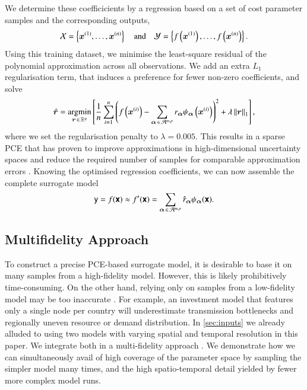 We determine these coefficicients by a regression based on
a set of cost parameter samples
and the corresponding outputs,
\begin{equation}
    \mathcal{X} = \left\{ \bm x^{(1)},\dots,\bm x^{(n)} \right\} \quad\text{and}\quad 
    \mathcal{Y} = \left\{ f\left(\bm x^{(1)}\right),\dots,f\left(\bm x^{(n)}\right) \right\}.
\end{equation}
Using this training dataset, we minimise the least-square residual of the polynomial approximation across all observations.
We add an extra $L_1$ regularisation term, %
that induces a preference for fewer non-zero coefficients, and solve
\begin{equation}
    \hat{\bm{r}} = \operatorname*{\arg\!\min}_{\bm{r} \,\in\, \mathbb{R}^q} \left[ \frac{1}{n} \sum_{i=1}^n \left(
        f\left(\bm x^{(i)}\right) - \sum_{{\bm{\alpha}} \,\in\, \mathcal{A}^{m,p}} r_{\bm{\alpha}} \psi_{\bm{\alpha}}\left(\bm x^{(i)}\right)
        \right)^2  + \lambda \left\lVert\bm{r}\right\rVert_1 \right],
        \label{eq:regression}
    \end{equation}
where we set the regularisation penalty to $\lambda=0.005$.
This results in a sparse PCE that has proven to
improve approximations in high-dimensional uncertainty spaces
and reduce the required number of samples for comparable approximation errors \cite{gratiet_metamodel-based_2015}.
Knowing the optimised regression coefficients, we can now assemble the complete surrogate model
\begin{equation}
    \mathsf{y} = f(\boldsymbol{\mathsf{x}}) \approx f'(\boldsymbol{\mathsf{x}}) = \sum_{{\bm{\alpha}} \,\in\, \mathcal{A}^{m,p}} \hat{r}_{\bm{\alpha}} \psi_{\bm{\alpha}} (\boldsymbol{\mathsf{x}}).
\end{equation}

\subsection{Multifidelity Approach}
\label{sec:multifidelity}


To construct a precise PCE-based surrogate model, it is desirable to base it
on many samples from a high-fidelity model.
However, this is likely prohibitively time-consuming.
On the other hand, relying only on samples from a
low-fidelity model may be too inaccurate \cite{ng_multifidelity_2012}.
For example, an investment model that features only a single node per country
will underestimate transmission bottlenecks and regionally uneven resource or demand distribution.
In \cref{sec:inputs} we already alluded to using
two models with varying spatial and temporal resolution in this paper.
We integrate both in a multi-fidelity approach \cite{ng_multifidelity_2012,palar_multi-fidelity_2016}.
We demonstrate how we can
simultaneously avail of high coverage of the parameter space by sampling
the simpler model many times, and the high spatio-temporal detail yielded by fewer more complex model runs.

